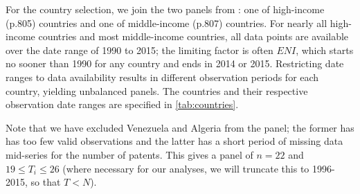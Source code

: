 \documentclass[12pt,a4paper]{article}
\begin{document}
For the country selection, we join the two panels from \cite{tibaIncomeTradeOpenness2018}: one of high-income (p.805) countries and one of middle-income (p.807) countries.
For nearly all high-income countries and most middle-income countries, all data points are available over the date range of 1990 to 2015; the limiting factor is often $ENI$, which starts no sooner than 1990 for any country and ends in 2014 or 2015.
Restricting date ranges to data availability results in different observation periods for each country, yielding unbalanced panels.
The countries and their respective observation date ranges are specified in \cref{tab:countries}.

Note that we have excluded Venezuela and Algeria from the panel; the former has has too few valid observations and the latter has a short period of missing data mid-series for the number of patents.
This gives a panel of $n=22$ and $19 \leq T_i \leq 26$ (where necessary for our analyses, we will truncate this to 1996-2015, so that $T < N$).
\end{document}
